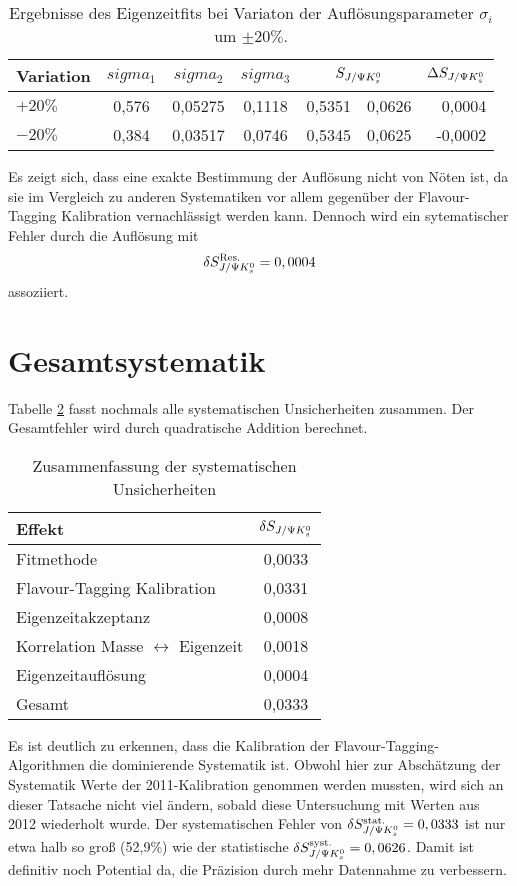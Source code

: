 \begin{table}[hptb]
\centering
\caption{Ergebnisse des Eigenzeitfits bei Variaton der Auflösungsparameter $\sigma_i$ um $\pm 20\%$.}
\label{tab:syst_resolution}
\begin{tabular}{l c c c r@{$\pm$}l r }
\hline \hline
Variation & $sigma_1$ & $sigma_2$ & $sigma_3$ & \multicolumn{2}{c}{$S_{J/\Psi K_s^0}$} & $\Delta S_{J/\Psi K_s^0}$ \\ \hline
$+20\%$ & 0,576 & 0,05275 & 0,1118 & 0,5351 & 0,0626 & 0,0004 \\
$-20\%$ & 0,384 & 0,03517 & 0,0746 & 0,5345 & 0,0625 & -0,0002 \\ \hline \hline
\end{tabular}
\end{table}

Es zeigt sich, dass eine exakte Bestimmung der Auflösung nicht von Nöten ist, da sie im Vergleich zu anderen Systematiken vor allem gegenüber der Flavour-Tagging Kalibration vernachlässigt werden kann. Dennoch wird ein sytematischer Fehler durch die Auflösung mit
\begin{align}
\delta S_{J/\Psi K_s^0}^{\text{Res.}} = 0,0004
\end{align}
assoziiert.

\section{Gesamtsystematik}
Tabelle \ref{tab:syst_gesamt} fasst nochmals alle systematischen Unsicherheiten zusammen. Der Gesamtfehler wird durch quadratische Addition berechnet.

\begin{table}[hptb]
\centering
\caption{Zusammenfassung der systematischen Unsicherheiten}
\label{tab:syst_gesamt}
\begin{tabular}{l c }
\hline \hline
Effekt & $\delta S_{J/\Psi K_s^0}$ \\ \hline
Fitmethode & 0,0033 \\
Flavour-Tagging Kalibration & 0,0331 \\
Eigenzeitakzeptanz & 0,0008 \\
Korrelation Masse $\leftrightarrow$ Eigenzeit & 0,0018 \\ 
Eigenzeitauflösung & 0,0004 \\ \hline 
Gesamt & 0,0333 \\ \hline \hline
\end{tabular}
\end{table}
Es ist deutlich zu erkennen, dass die Kalibration der Flavour-Tagging-Algorithmen die dominierende Systematik ist. Obwohl hier zur Abschätzung der Systematik Werte der 2011-Kalibration genommen werden mussten, wird sich an dieser Tatsache nicht viel ändern, sobald diese Untersuchung mit Werten aus 2012 wiederholt wurde. Der systematischen Fehler von $\delta S_{J/\Psi K_s^0}^{\text{stat.}}=0,0333$ ist nur etwa halb so groß (52,9\%) wie der statistische $\delta S_{J/\Psi K_s^0}^{\text{syst.}}=0,0626$. Damit ist definitiv noch Potential da, die Präzision durch mehr Datennahme zu verbessern.